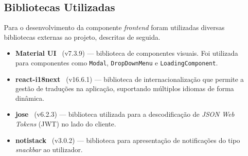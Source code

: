 \subsection{Bibliotecas Utilizadas}

Para o desenvolvimento da componente \textit{frontend} foram utilizadas diversas bibliotecas externas ao projeto, descritas de seguida.

\begin{itemize}
    \item \textbf{Material UI}~\cite{material-ui} (v7.3.9) --- biblioteca de componentes visuais. Foi utilizada para componentes como \texttt{Modal}, \texttt{DropDownMenu} e \texttt{LoadingComponent}. 
    \item \textbf{react-i18next}~\cite{react-i18next} (v16.6.1) --- biblioteca de internacionalização que permite a gestão de traduções na aplicação, suportando múltiplos idiomas de forma dinâmica.

    \item \textbf{jose}~\cite{jose} (v6.2.3) --- biblioteca utilizada para a descodificação de \textit{JSON Web Tokens} (JWT) no lado do cliente.

    \item \textbf{notistack}~\cite{notistack} (v3.0.2) --- biblioteca para apresentação de notificações do tipo \textit{snackbar} ao utilizador.
\end{itemize}

